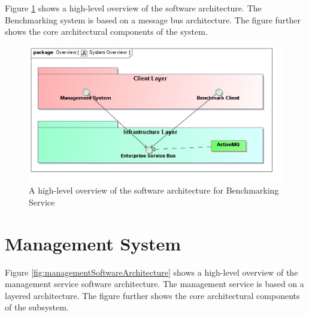 Figure \ref{fig:softwareArchitecture} shows a high-level overview of the 
software architecture. The Benchmarking system is based on a message bus 
architecture. The figure further shows the core architectural components of
the system.

\begin{figure}[H]
  \begin{center}
  \includegraphics[scale=0.4]{../Diagrams and Charts/Overview/SystemOverview.jpg}
  \caption{A high-level overview of the software architecture for Benchmarking Service}
  \label{fig:softwareArchitecture}
  \end{center}
\end{figure}

\section{Management System}
Figure \ref{fig:managementSoftwareArchitecture} shows a high-level overview of
the management service software architecture. The management service is based
on a layered architecture. The figure further shows the core architectural
components of the subsystem.

